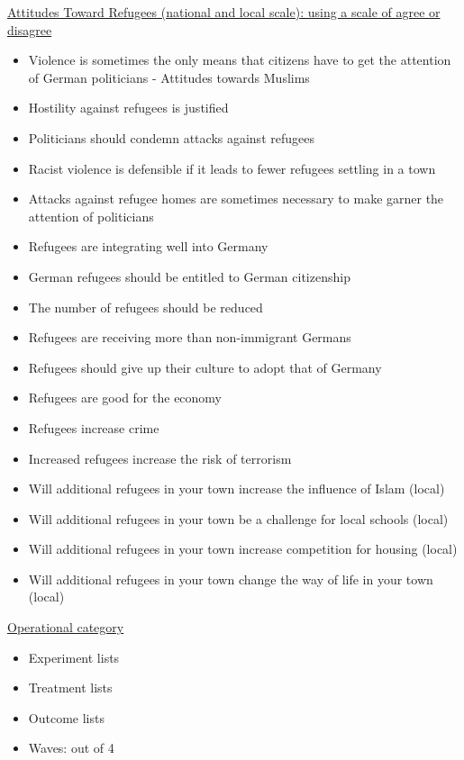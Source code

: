 \documentclass[
]{article}
\begin{document}
\uline{Attitudes Toward Refugees (national and local scale): using a
scale of agree or disagree}

\begin{itemize}
\item
  Violence is sometimes the only means that citizens have to get the
  attention of German politicians - Attitudes towards Muslims
\item
  Hostility against refugees is justified
\item
  Politicians should condemn attacks against refugees
\item
  Racist violence is defensible if it leads to fewer refugees settling
  in a town
\item
  Attacks against refugee homes are sometimes necessary to make garner
  the attention of politicians
\item
  Refugees are integrating well into Germany
\item
  German refugees should be entitled to German citizenship
\item
  The number of refugees should be reduced
\item
  Refugees are receiving more than non-immigrant Germans
\item
  Refugees should give up their culture to adopt that of Germany
\item
  Refugees are good for the economy
\item
  Refugees increase crime
\item
  Increased refugees increase the risk of terrorism
\item
  Will additional refugees in your town increase the influence of Islam
  (local)
\item
  Will additional refugees in your town be a challenge for local schools
  (local)
\item
  Will additional refugees in your town increase competition for housing
  (local)
\item
  Will additional refugees in your town change the way of life in your
  town (local)
\end{itemize}

\uline{Operational category}

\begin{itemize}
\item
  Experiment lists
\item
  Treatment lists
\item
  Outcome lists
\item
  Waves: out of 4
\end{itemize}
\end{document}
